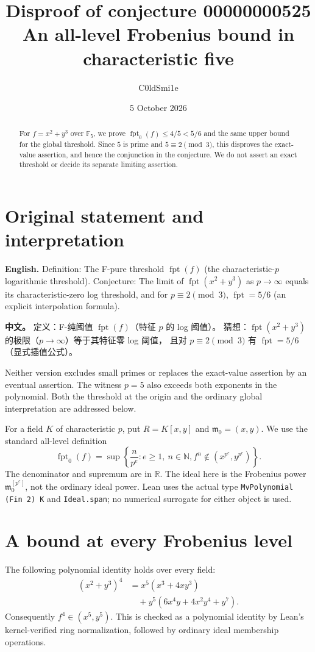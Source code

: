 \documentclass[11pt,a4paper]{article}
\title{Disproof of conjecture 00000000525\\[5pt]
\large An all-level Frobenius bound in characteristic five}
\author{C0ldSmi1e}
\date{5 October 2026}
\newcommand{\lean}[1]{\nolinkurl{#1}}
\newcommand{\F}{\mathbb F}
\newcommand{\fpt}{\operatorname{fpt}}
\newcommand{\origin}{\mathfrak m_0}
\begin{document}
\maketitle
\begin{abstract}
For $f=x^2+y^3$ over $\F_5$, we prove
$\fpt_0(f)\le 4/5<5/6$ and the same upper bound for the global threshold.
Since $5$ is prime and $5\equiv2\pmod3$, this disproves the exact-value
assertion, and hence the conjunction in the conjecture. We do not assert
an exact threshold or decide its separate limiting assertion.
\end{abstract}

\section{Original statement and interpretation}
\textbf{English.} Definition: The F-pure threshold $\fpt(f)$ (the
characteristic-$p$ logarithmic threshold). Conjecture: The limit of
$\fpt(x^2+y^3)$ as $p\to\infty$ equals its characteristic-zero log
threshold, and for $p\equiv2\pmod3$, $\fpt=5/6$ (an explicit interpolation
formula).

\textbf{中文。} 定义：F-纯阈值 $\fpt(f)$（特征 $p$ 的 log 阈值）。
猜想：$\fpt(x^2+y^3)$ 的极限（$p\to\infty$）等于其特征零 log 阈值，
且对 $p\equiv2\pmod3$ 有 $\fpt=5/6$（显式插值公式）。

Neither version excludes small primes or replaces the exact-value assertion
by an eventual assertion. The witness $p=5$ also exceeds both exponents
in the polynomial. Both the threshold at the origin and the ordinary
global interpretation are addressed below.

For a field $K$ of characteristic $p$, put $R=K[x,y]$ and
$\origin=(x,y)$. We use the standard all-level definition\,\cite{sv}
\[
 \fpt_0(f)=\sup\left\{\frac{n}{p^e}: e\ge1,\ n\in\mathbb N,
 f^n\notin(x^{p^e},y^{p^e})\right\}.
\]
The denominator and supremum are in $\mathbb R$. The ideal here is the
Frobenius power $\origin^{[p^e]}$, not the ordinary ideal power.
Lean uses the actual type \lean{MvPolynomial (Fin 2) K} and
\lean{Ideal.span}; no numerical surrogate for either object is used.

\newpage
\section{A bound at every Frobenius level}
The following polynomial identity holds over every field:
\begin{align*}
 (x^2+y^3)^4
 &=x^5(x^3+4xy^3)\\
 &\quad+y^5(6x^4y+4x^2y^4+y^7).
\end{align*}
Consequently $f^4\in(x^5,y^5)$. This is checked as a polynomial identity
by Lean's kernel-verified ring normalization, followed by ordinary ideal
membership operations.
\end{document}
